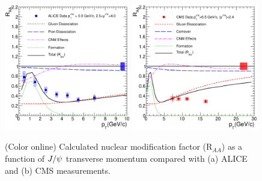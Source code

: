 \documentclass[aps,prc,preprint,superscriptaddress,showpacs,showkeys]{revtex4-1}
\begin{document}
\begin{figure}
\includegraphics[width=0.49\textwidth]{Figures/Fig5a_ALICE_RAAPt.eps}
\includegraphics[width=0.49\textwidth]{Figures/Fig5b_CMS_RAAPt.eps}
\caption{(Color online) Calculated nuclear modification factor (R$_{AA}$) as a function of $J/\psi$ 
transverse momentum compared with (a) ALICE and (b) CMS measurements.}
\label{fig:JPsiRaaVsPt}
\end{figure}


\end{document}
